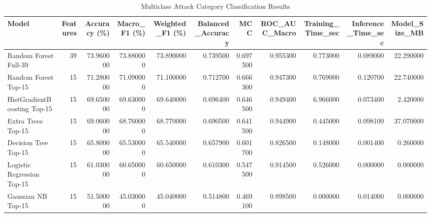 \begin{table}
\caption{Multiclass Attack Category Classification Results}
\label{tab:multiclass_classifier_comparison}
\begin{tabular}{lrrrrrrrrrr}
\toprule
Model & Features & Accuracy (\%) & Macro\_F1 (\%) & Weighted\_F1 (\%) & Balanced\_Accuracy & MCC & ROC\_AUC\_Macro & Training\_Time\_sec & Inference\_Time\_sec & Model\_Size\_MB \\
\midrule
Random Forest Full-39 & 39 & 73.960000 & 73.880000 & 73.890000 & 0.739500 & 0.697500 & 0.955300 & 0.773000 & 0.089000 & 22.290000 \\
Random Forest Top-15 & 15 & 71.280000 & 71.090000 & 71.100000 & 0.712700 & 0.666300 & 0.947300 & 0.769000 & 0.120700 & 22.740000 \\
HistGradientBoosting Top-15 & 15 & 69.650000 & 69.630000 & 69.640000 & 0.696400 & 0.646500 & 0.949400 & 6.966000 & 0.073400 & 2.420000 \\
Extra Trees Top-15 & 15 & 69.060000 & 68.760000 & 68.770000 & 0.690500 & 0.641500 & 0.944900 & 0.445000 & 0.098100 & 37.070000 \\
Decision Tree Top-15 & 15 & 65.800000 & 65.530000 & 65.540000 & 0.657900 & 0.601700 & 0.826500 & 0.148000 & 0.001400 & 0.260000 \\
Logistic Regression Top-15 & 15 & 61.030000 & 60.650000 & 60.650000 & 0.610300 & 0.547500 & 0.914500 & 0.526000 & 0.000000 & 0.000000 \\
Gaussian NB Top-15 & 15 & 51.500000 & 45.030000 & 45.040000 & 0.514800 & 0.469100 & 0.898500 & 0.000000 & 0.014000 & 0.000000 \\
\bottomrule
\end{tabular}
\end{table}
